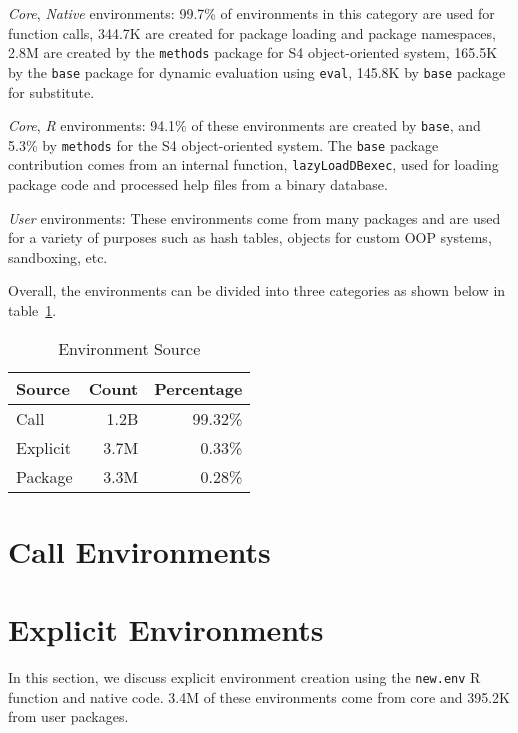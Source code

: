 \documentclass[10pt,review,sigplan,anonymous=true,authorversion=true,nonacm=true]{acmart}
\newcommand{\code}[1]{\lstinline |#1|\xspace}
\newcommand{\newEnv}{\code{new.env}}
\begin{document}
\emph{Core}, \emph{Native} environments: 99.7\% of environments in this category
are used for function calls, 344.7K are created for package loading and package
namespaces, 2.8M are created by the \code{methods} package for S4
object-oriented system, 165.5K by the \code{base} package for dynamic evaluation
using \code{eval}, 145.8K by \code{base} package for substitute.

\emph{Core}, \emph{R} environments: 94.1\% of these environments are created by
\code{base}, and 5.3\% by \code{methods} for the S4 object-oriented system. The
\code{base} package contribution comes from an internal function,
\code{lazyLoadDBexec}, used for loading package code and processed help files
from a binary database.

\emph{User} environments: These environments come from many packages and are
used for a variety of purposes such as hash tables, objects for custom OOP
systems, sandboxing, etc.

Overall, the environments can be divided into three categories as shown below in
table~\ref{table:env_category}.

\begin{table}
  \vspace{-3mm}
  \small
  \caption{Environment Source} \label{table:env_category}
  \centering
  \begin{tabular}{l|rr}
    \toprule
    \textbf{Source}&\textbf{Count}&\textbf{Percentage}\\
    \midrule
    Call&1.2B&99.32\%\\
    Explicit&3.7M&0.33\%\\
    Package&3.3M&0.28\%\\
    \bottomrule
  \end{tabular}
\end{table}

\section{Call Environments}



\section{Explicit Environments}
In this section, we discuss explicit environment creation using the \newEnv R
function and native code. 3.4M of these environments come from core and 395.2K
from user packages.
\end{document}
